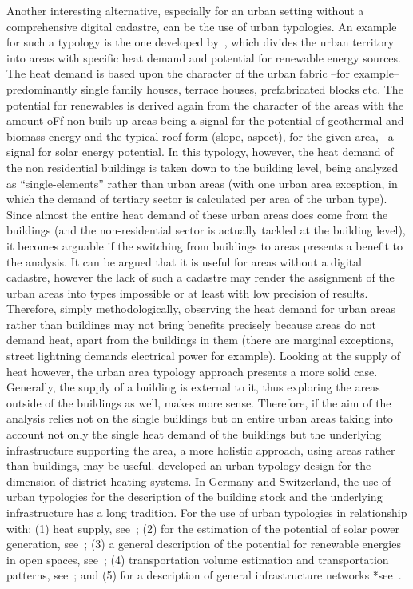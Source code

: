 \documentclass[authoryear,preprint,review,12pt]{elsarticle}
\begin{document}
\begin{linenumbers}
Another interesting alternative, especially for an urban setting without a
comprehensive digital cadastre, can be the use of urban typologies.
An example for such a typology is the one developed by~\cite{Hegger.2014}, which
divides the urban territory into areas with specific heat demand and potential
for renewable energy sources. The heat demand is based upon the character of
the urban fabric --for example-- predominantly single family houses, terrace
houses, prefabricated blocks etc. The potential for renewables is derived again
from the character of the areas with the amount oFf non built up areas being a
signal for the potential of geothermal and biomass energy and the typical roof
form (slope, aspect), for the given area, --a signal for solar energy
potential. In this typology, however, the heat demand of the non residential
buildings is taken down to the building level, being analyzed as ``single-elements''
rather than urban areas (with one urban area exception, in which the demand of
tertiary sector is calculated per area of the urban type). Since almost the
entire heat demand of these urban areas does come from the buildings (and the
non-residential sector is actually tackled at the building level), it becomes
arguable if the switching from buildings to areas presents a benefit to the
analysis. It can be argued that it is useful for areas without a digital
cadastre, however the lack of such a cadastre may render the assignment of the
urban areas into types impossible or at least with low precision of results.
Therefore, simply methodologically, observing the heat demand for urban areas
rather than buildings may not bring benefits precisely because areas do not
demand heat, apart from the buildings in them (there are marginal exceptions,
street lightning demands electrical power for example). Looking at the supply
of heat however, the urban area typology approach presents a more solid case.
Generally, the supply of a building is external to it, thus exploring the areas
outside of the buildings as well, makes more sense. Therefore,
%
if the aim of the analysis relies not on the single buildings but on entire
urban areas taking into account not only the single heat demand of the
buildings but the underlying infrastructure supporting the area, a more
holistic approach, using areas rather than buildings, may be useful. \citet{Roth.1980}
developed an urban typology design for the dimension of
district heating systems. In Germany and Switzerland, the use of urban
typologies for the description of the building stock and the underlying
infrastructure has a long tradition.
For the use of
urban typologies in relationship with: (1) heat supply, see~\cite{Roth.1980,
Sieverts.1980, Blesl.2002, Jentsch.2008}; (2) for the estimation of the
potential of solar power generation, see~\cite{Everding.2004}; (3) a general
description of the potential for renewable energies in open spaces,
see~\cite{Genske.2009}; (4) transportation volume estimation and transportation
patterns, see~\cite{Marconi.2006, Krug.2006}; and (5) for a description of
general infrastructure networks *see~\cite{Buchert.2004, Ecoplan.2000,
Einig.2006, Erhorn.2011}.\\


\end{linenumbers}
\end{document}
